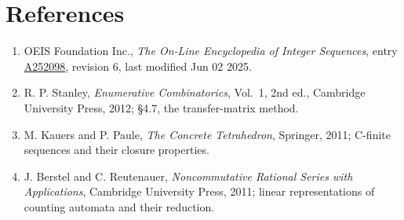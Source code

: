 \documentclass[11pt]{article}
\theoremstyle{definition}
\begin{document}
\section{References}

\begin{enumerate}

\item OEIS Foundation Inc., \emph{The On-Line Encyclopedia of Integer Sequences}, entry \href{https://oeis.org/A252098}{A252098}, revision 6, last modified Jun 02 2025.

\item R. P. Stanley, \emph{Enumerative Combinatorics}, Vol.~1, 2nd ed., Cambridge University Press, 2012; \S4.7, the transfer-matrix method.

\item M. Kauers and P. Paule, \emph{The Concrete Tetrahedron}, Springer, 2011; C-finite sequences and their closure properties.

\item J. Berstel and C. Reutenauer, \emph{Noncommutative Rational Series with Applications}, Cambridge University Press, 2011; linear representations of counting automata and their reduction.

\end{enumerate}
\end{document}
